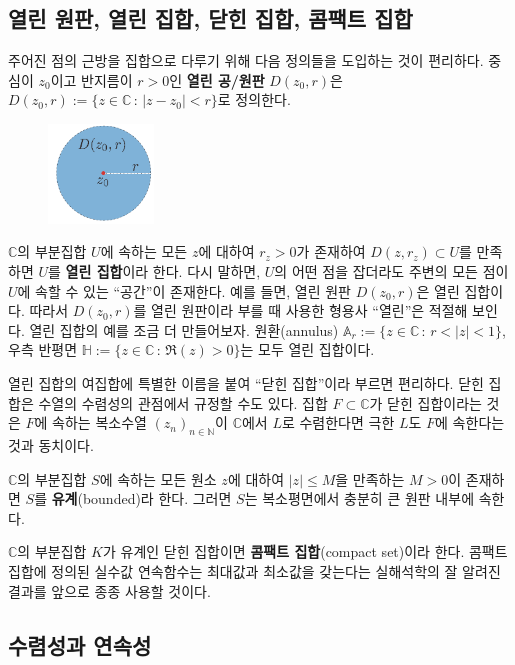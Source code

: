 \subsection{열린 원판, 열린 집합, 닫힌 집합, 콤팩트 집합}

주어진 점의 근방을 집합으로 다루기 위해 다음 정의들을 도입하는 것이 편리하다.
중심이 $z_0$이고 반지름이 $r>0$인 {\bf 열린 공/원판} $D(z_0,r)$은 
$D(z_0,r) :=\{ z\in\mathbb C \,:\, |z-z_0| <r \}$로 정의한다.

\begin{figure}[!h]
\begin{center}
\includegraphics[width=0.25\textwidth]{./SaltChapter/figs/fig-1-0-1}
\end{center}
\end{figure}

$\mathbb C$의 부분집합 $U$에 속하는
모든 $z$에 대하여 $r_z>0$가 존재하여 $D(z,r_z)\subset U$를 만족하면
$U$를 {\bf 열린 집합}이라 한다.
다시 말하면, $U$의 어떤 점을 잡더라도 
주변의 모든 점이 $U$에 속할 수 있는 ``공간''이 존재한다.
예를 들면, 열린 원판 $D(z_0,r)$은 열린 집합이다.
따라서  $D(z_0,r)$를 열린 원판이라 부를 때 사용한 형용사 ``열린''은 적절해 보인다.
열린 집합의 예를 조금 더 만들어보자.
원환(annulus) $\mathbb A_r := \{ z\in\mathbb C\,:\, r<|z|<1\}$,
우측 반평면 $\mathbb H:= \{z\in\mathbb C\,:\, \Re(z)>0\}$는 모두 열린 집합이다.

열린 집합의 여집합에 특별한 이름을 붙여 ``닫힌 집합''이라 부르면 편리하다.
닫힌 집합은 수열의 수렴성의 관점에서 규정할 수도 있다.
집합 $F\subset \mathbb C$가 닫힌 집합이라는 것은
$F$에 속하는 복소수열 $(z_n)_{n\in\mathbb N}$이  $\mathbb C$에서 $L$로 수렴한다면
극한 $L$도 $F$에 속한다는 것과 동치이다.

$\mathbb C$의 부분집합 $S$에 속하는 모든 원소 $z$에 대하여
$|z|\le M$을 만족하는 $M>0$이 존재하면 $S$를 {\bf 유계}(bounded)라 한다.
그러면 $S$는 복소평면에서 충분히 큰 원판 내부에 속한다.

$\mathbb C$의 부분집합 $K$가 유계인 닫힌 집합이면 {\bf 콤팩트 집합}(compact set)이라 한다.
콤팩트 집합에 정의된 실수값 연속함수는 최대값과 최소값을 갖는다는
실해석학의 잘 알려진 결과를
앞으로 종종 사용할 것이다.

\subsection{수렴성과 연속성}

